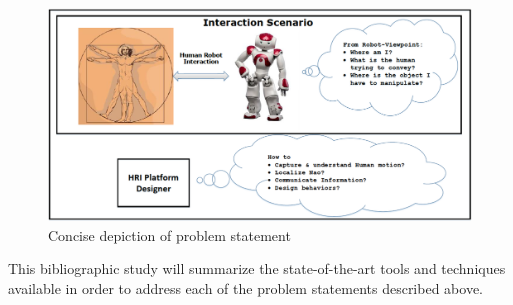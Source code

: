 \begin{figure}[H]
\centering
\includegraphics[width=\textwidth]{assets/ProblemStatement.png}
\caption{Concise depiction of problem statement}
\label{fig:problemstatement}
\end{figure}%

	This bibliographic study will summarize the state-of-the-art tools and techniques available in order to address each of the problem statements described above.

